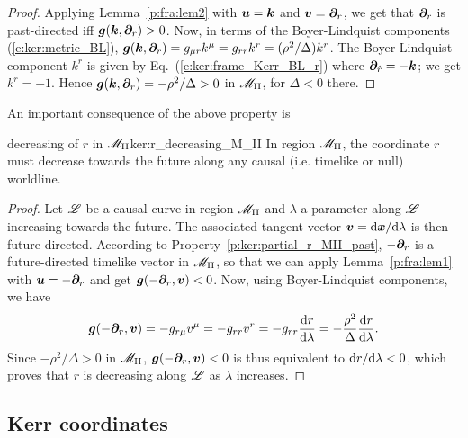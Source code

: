 \begin{proof}
Applying Lemma~\ref{p:fra:lem2} with $\bm{u}=\bm{k}$ and
$\bm{v} = \bm{\partial}_r$, we get that $\bm{\partial}_r$ is past-directed iff $\bm{g}(\bm{k},\bm{\partial}_r) > 0$.
Now, in terms of the Boyer-Lindquist components (\ref{e:ker:metric_BL}),
$\bm{g}(\bm{k},\bm{\partial}_r) = g_{\mu r} k^\mu = g_{rr} k^r = (\rho^2 / \Delta) k^r$.
The Boyer-Lindquist component $k^r$ is given by Eq.~(\ref{e:ker:frame_Kerr_BL_r}) where
$\bm{\partial}_{\hat{r}} = - \bm{k}$; we get $k^r = -1$. Hence $\bm{g}(\bm{k},\bm{\partial}_r) = - \rho^2 /\Delta > 0$
in $\mathscr{M}_{\rm II}$, for $\Delta < 0$ there.
\end{proof}

An important consequence of the above property is
\begin{tprop}{decreasing of $r$ in $\mathscr{M}_{\rm II}$}{ker:r_decreasing_M_II}
In region $\mathscr{M}_{\rm II}$, the coordinate $r$ must decrease towards the future
along any causal (i.e. timelike or null) worldline.
\end{tprop}

\begin{proof}
Let $\mathscr{L}$ be a causal curve in region $\mathscr{M}_{\rm II}$ and $\lambda$ a parameter
along $\mathscr{L}$ increasing towards the future. The associated tangent vector
$\bm{v} = \mathrm{d}\bm{x}/\mathrm{d}\lambda$ is then future-directed.
According to Property~\ref{p:ker:partial_r_MII_past}, $-\bm{\partial}_r$ is a future-directed timelike vector
in $\mathscr{M}_{\rm II}$, so that we can  apply Lemma~\ref{p:fra:lem1}
with $\bm{u} = - \bm{\partial}_r$ and get $\bm{g}(-\bm{\partial}_r, \bm{v}) < 0$.
Now, using Boyer-Lindquist
components, we have
\[
    \bm{g}(-\bm{\partial}_r, \bm{v}) = - g_{r\mu} v^\mu = - g_{rr} v^r = - g_{rr} \frac{\mathrm{d} r}{\mathrm{d} \lambda}
    = - \frac{\rho^2}{\Delta} \frac{\mathrm{d} r}{\mathrm{d} \lambda} .
\]
Since $-\rho^2/\Delta > 0$ in $\mathscr{M}_{\rm II}$, $\bm{g}(-\bm{\partial}_r, \bm{v}) < 0$
is thus equivalent to $\mathrm{d} r/ \mathrm{d}\lambda < 0$, which proves that $r$ is decreasing
along $\mathscr{L}$ as $\lambda$ increases.
\end{proof}




\subsection{Kerr coordinates} \label{s:ker:3p1_Kerr_coord}

